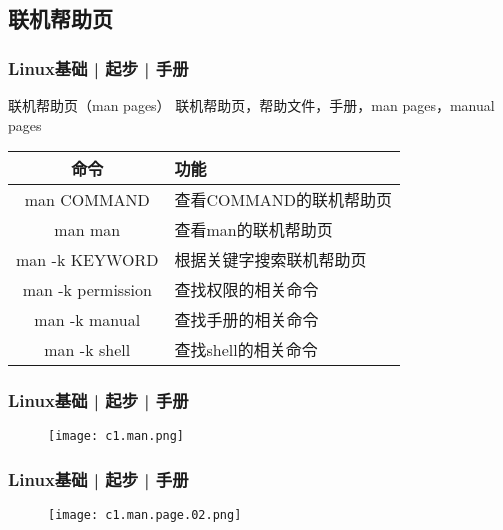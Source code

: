 \subsection{联机帮助页}
\begin{frame}
  \frametitle{Linux基础 | 起步 | 手册}
  \begin{block}{联机帮助页（man pages）}
    联机帮助页，帮助文件，手册，man pages，manual pages
  \end{block}
  \pause
  \begin{table}
    \centering
    \begin{tabular}{cl}
      \hline
      \rowcolor{blue!50}命令 & 功能\\
      \hline
      \alert{man COMMAND} & 查看COMMAND的联机帮助页\\
      man man & 查看man的联机帮助页\\
      \hline
      \alert{man -k KEYWORD} & 根据关键字搜索联机帮助页\\
      man -k permission & 查找权限的相关命令\\
      man -k manual & 查找手册的相关命令\\
      man -k shell & 查找shell的相关命令\\
      \hline
    \end{tabular}
  \end{table}
\end{frame}

\begin{frame}
  \frametitle{Linux基础 | 起步 | 手册}
  \begin{figure}
    \centering
    \texttt{[image: c1.man.png]}
  \end{figure}
\end{frame}

\begin{frame}
  \frametitle{Linux基础 | 起步 | 手册}
  \begin{figure}
    \centering
    \texttt{[image: c1.man.page.02.png]}
  \end{figure}
\end{frame}

